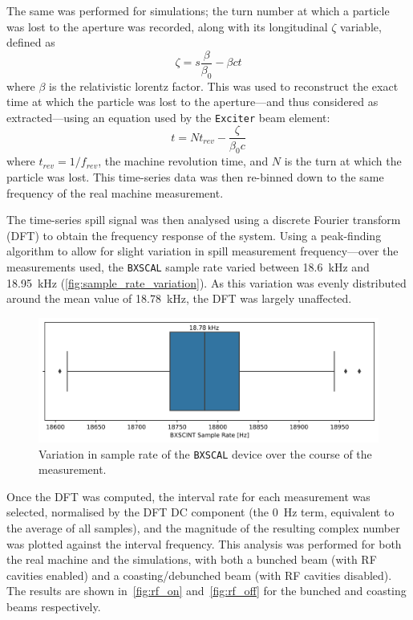 \documentclass[11pt]{report}
\begin{document}
The same was performed for simulations; the turn number at which a particle was lost to the aperture was recorded, along with its longitudinal $\zeta$ variable, defined as
\begin{equation}
  \zeta = s \frac{\beta}{\beta_0} - \beta c t
\end{equation}
where $\beta$ is the relativistic lorentz factor. This was used to reconstruct the exact time at which the particle was lost to the aperture---and thus considered as extracted---using an equation used by the \verb|Exciter| beam element:
\begin{equation}
  t = N t_{rev} - \frac\zeta{\beta_0 c}
\end{equation}
where $t_{rev}=1/f_{rev}$, the machine revolution time, and $N$ is the turn at which the particle was lost. This time-series data was then re-binned down to the same frequency of the real machine measurement.

The time-series spill signal was then analysed using a discrete Fourier transform (DFT) to obtain the frequency response of the system. Using a peak-finding algorithm to allow for slight variation in spill measurement frequency---over the measurements used, the \verb|BXSCAL| sample rate varied between \qty{18.6}{\kilo\hertz} and \qty{18.95}{\kilo\hertz} (\autoref{fig:sample_rate_variation}). As this variation was evenly distributed around the mean value of \qty{18.78}{\kilo\hertz}, the DFT was largely unaffected.

\begin{figure}
  \centering
  \includegraphics*[width=0.8\linewidth]{sample_rate_variation.png}
  \caption{Variation in sample rate of the \texttt{BXSCAL} device over the course of the measurement.}\label{fig:sample_rate_variation}
\end{figure}

Once the DFT was computed, the interval rate for each measurement was selected, normalised by the DFT DC component (the \qty{0}{\hertz} term, equivalent to the average of all samples), and the magnitude of the resulting complex number was plotted against the interval frequency. This analysis was performed for both the real machine and the simulations, with both a bunched beam (with RF cavities enabled) and a coasting/debunched beam (with RF cavities disabled). The results are shown in~\autoref{fig:rf_on} and~\autoref{fig:rf_off} for the bunched and coasting beams respectively.
\end{document}
